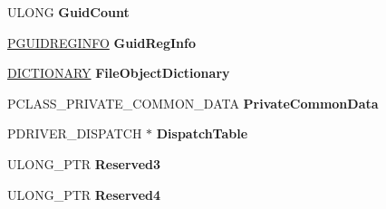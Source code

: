 \begin{DoxyCompactItemize}
U\+L\+O\+NG {\bfseries Guid\+Count}
\item 
\mbox{\label{struct___c_o_m_m_o_n___d_e_v_i_c_e___e_x_t_e_n_s_i_o_n_af0b5a16fa009d0d024549b29cc880a6b}} 
\hyperlink{struct_g_u_i_d_r_e_g_i_n_f_o}{P\+G\+U\+I\+D\+R\+E\+G\+I\+N\+FO} {\bfseries Guid\+Reg\+Info}
\item 
\mbox{\label{struct___c_o_m_m_o_n___d_e_v_i_c_e___e_x_t_e_n_s_i_o_n_a4be3f414381b994d7904239892dfadc6}} 
\hyperlink{struct___d_i_c_t_i_o_n_a_r_y}{D\+I\+C\+T\+I\+O\+N\+A\+RY} {\bfseries File\+Object\+Dictionary}
\item 
\mbox{\label{struct___c_o_m_m_o_n___d_e_v_i_c_e___e_x_t_e_n_s_i_o_n_ae5f53556bc01e6b85d54be1898797741}} 
P\+C\+L\+A\+S\+S\+\_\+\+P\+R\+I\+V\+A\+T\+E\+\_\+\+C\+O\+M\+M\+O\+N\+\_\+\+D\+A\+TA {\bfseries Private\+Common\+Data}
\item 
\mbox{\label{struct___c_o_m_m_o_n___d_e_v_i_c_e___e_x_t_e_n_s_i_o_n_af92cd157aed967a4fb148f4ad8651e93}} 
P\+D\+R\+I\+V\+E\+R\+\_\+\+D\+I\+S\+P\+A\+T\+CH $\ast$ {\bfseries Dispatch\+Table}
\item 
\mbox{\label{struct___c_o_m_m_o_n___d_e_v_i_c_e___e_x_t_e_n_s_i_o_n_acd72ce6c32a5c1ca00cf10447fda710a}} 
U\+L\+O\+N\+G\+\_\+\+P\+TR {\bfseries Reserved3}
\item 
\mbox{\label{struct___c_o_m_m_o_n___d_e_v_i_c_e___e_x_t_e_n_s_i_o_n_a4053c08119657223abff129e7c102a1b}} 
U\+L\+O\+N\+G\+\_\+\+P\+TR {\bfseries Reserved4}
\end{DoxyCompactItemize}


